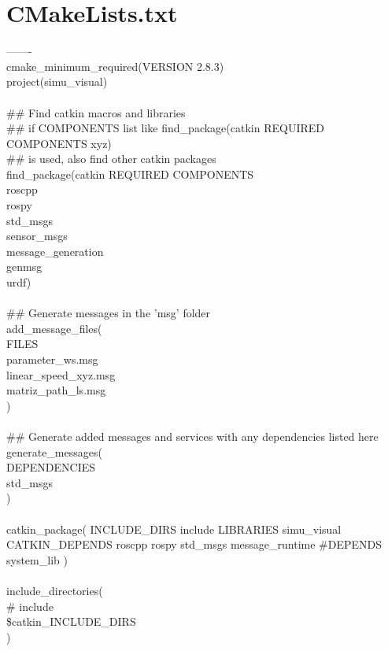     \section{CMakeLists.txt}
-------\\
cmake\_minimum\_required(VERSION 2.8.3)\\
project(simu\_visual)\\
\\
\#\# Find catkin macros and libraries\\
\#\# if COMPONENTS list like find\_package(catkin REQUIRED COMPONENTS xyz)\\
\#\# is used, also find other catkin packages\\
find\_package(catkin REQUIRED COMPONENTS\\
  roscpp\\
  rospy\\
  std\_msgs\\
  sensor\_msgs\\
  message\_generation\\
  genmsg\\
  urdf)\\
\\
\#\# Generate messages in the 'msg' folder\\
 add\_message\_files(\\
   FILES\\
   parameter\_ws.msg\\
   linear\_speed\_xyz.msg\\
   matriz\_path\_ls.msg\\
 )\\
 \\
 \#\# Generate added messages and services with any dependencies listed here\\
 generate\_messages(\\
   DEPENDENCIES\\
   std\_msgs\\
 )\\
 \\
 catkin\_package(
  INCLUDE\_DIRS include
  LIBRARIES simu\_visual
  CATKIN\_DEPENDS roscpp rospy std\_msgs message\_runtime
  \#DEPENDS system\_lib
) \\
 \\
include\_directories( \\
\# include \\
  \${catkin\_INCLUDE\_DIRS} \\
) \\
 \\
    \newpage
    
